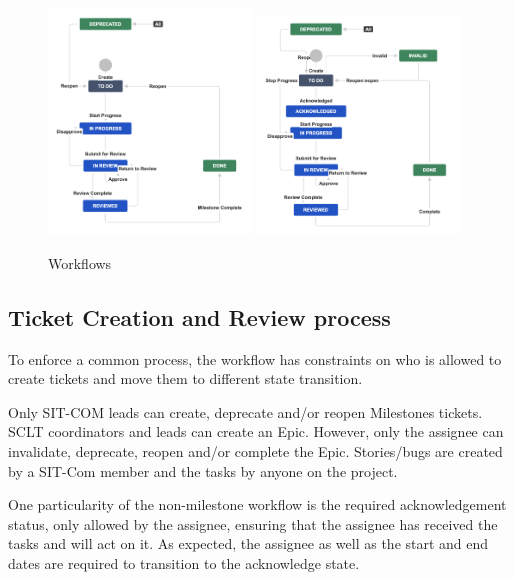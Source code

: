 \documentclass[SE,authoryear,toc]{lsstdoc}
\begin{document}
\begin{figure}[h]
\begin{center}
\includegraphics[width=0.48\textwidth]{WorkFlowMilestones.png}
\includegraphics[width=0.48\textwidth]{WorkFlowNonMilestones.png}
\caption{\label{fig:workflow} Workflows}
\end{center}
\end{figure}


\subsection{Ticket Creation and Review process}
To enforce a common process, the workflow has constraints on who is allowed to create tickets and move them to different state transition. 

Only SIT-COM leads can create, deprecate and/or reopen Milestones tickets. SCLT coordinators and leads can create an Epic. 
However, only the assignee can invalidate, deprecate, reopen and/or complete the Epic. 
Stories/bugs are created by a SIT-Com member and the tasks by anyone on the project. 

One particularity of the non-milestone workflow is the required acknowledgement status, only allowed by the assignee, ensuring that the assignee has received the tasks and will act on it. 
As expected, the assignee as well as the start and end dates are required to transition to the acknowledge state.
\end{document}
